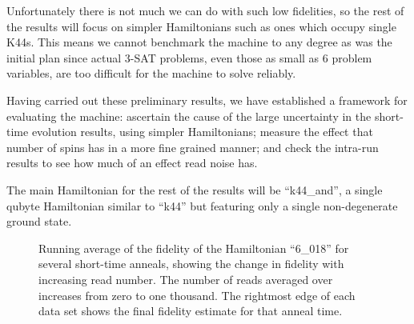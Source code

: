 Unfortunately there is not much we can do with such low fidelities, so the rest of the results will focus on simpler Hamiltonians such as ones which occupy single K44s.  This means we cannot benchmark the \machine machine to any degree as was the initial plan since actual 3-SAT problems, even those as small as 6 problem variables, are too difficult for the machine to solve reliably.

Having carried out these preliminary results, we have established a framework for evaluating the \machine machine: ascertain the cause of the large uncertainty in the short-time evolution results, using simpler Hamiltonians; measure the effect that number of spins has in a more fine grained manner; and check the intra-run results to see how much of an effect read noise has.


The main Hamiltonian for the rest of the results will be ``k44\_and'', a single qubyte Hamiltonian similar to ``k44'' but featuring only a single non-degenerate ground state.


\begin{figure}
	\caption[Running Fidelity Average]{Running average of the fidelity of the Hamiltonian ``6\_018'' for several short-time anneals, showing the change in fidelity with increasing read number.  The number of reads averaged over increases from zero to one thousand.  The rightmost edge of each data set shows the final fidelity estimate for that anneal time.  }
	\label{fig:running_avg}

\end{figure}

